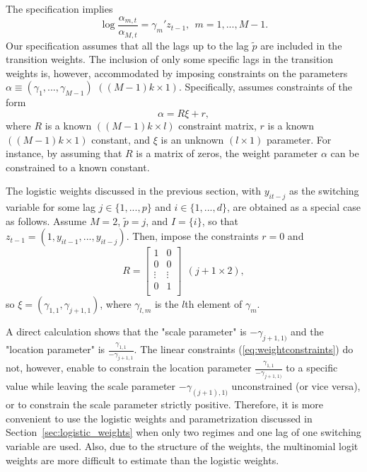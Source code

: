 \documentclass[nojss]{jss}
\begin{document}
The specification implies
\begin{equation}
\log\frac{\alpha_{m,t}}{\alpha_{M,t}}=\gamma_m'z_{t-1}, \ \ m=1,...,M-1.
\end{equation}
Our specification assumes that all the lags up to the lag $\tilde{p}$ are included in the transition weights. The inclusion of only some specific lags in the transition weights is, however, accommodated by imposing constraints on the parameters $\alpha \equiv (\gamma_1,...,\gamma_{M-1})$ $((M-1)k\times 1)$. Specifically,  assumes constraints of the form
\begin{equation}\label{eq:weightconstraints}
\alpha = R\xi + r,
\end{equation}
where $R$ is a known $((M-1)k\times l)$ constraint matrix, $r$ is a known $((M-1)k\times 1)$ constant, and $\xi$ is an unknown $(l \times 1)$ parameter. For instance, by assuming that $R$ is a matrix of zeros, the weight parameter $\alpha$ can be constrained to a known constant.

The logistic weights discussed in the previous section, with $y_{it-j}$ as the switching variable for some lag $j\in \lbrace 1,...,p \rbrace$ and $i\in \lbrace 1,...,d \rbrace$, are obtained as a special case as follows. Assume $M=2$, $\tilde{p}=j$, and $I=\lbrace i\rbrace$, so that $z_{t-1}=(1, y_{it-1},...,y_{it-j})$. Then, impose the constraints $r=0$ and
\begin{equation}
R=
\begin{bmatrix}
1 & 0 \\
0 & 0 \\
\vdots & \vdots \\
0 & 1 \\
\end{bmatrix}
\ \ (j+1 \times 2),
\end{equation}
so $\xi = (\gamma_{1,1},\gamma_{j+1,1})$, where $\gamma_{l,m}$ is the $l$th element of $\gamma_{m}$.

A direct calculation shows that the "scale parameter" is $-\gamma_{j+1,1)}$ and the "location parameter" is $\frac{\gamma_{1,1}}{-\gamma_{j+1,1}}$. The linear constraints (\ref{eq:weightconstraints}) do not, however, enable to constrain the location parameter $\frac{\gamma_{1,1}}{-\gamma_{j+1,1)}}$ to a specific value while leaving the scale parameter $-\gamma_{(j+1),1)}$ unconstrained (or vice versa), or to constrain the scale parameter strictly positive. Therefore, it is more convenient to use the logistic weights and parametrization discussed in Section~\ref{sec:logistic_weights} when only two regimes and one lag of one switching variable are used. Also, due to the structure of the weights, the multinomial logit weights are more difficult to estimate than the logistic weights.
\end{document}
